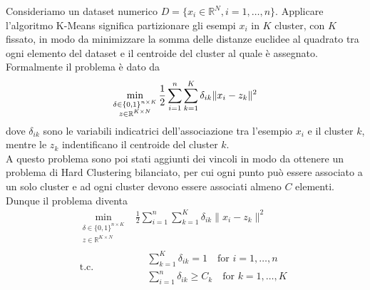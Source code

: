 \documentclass{article}
\begin{document}
    Consideriamo un dataset numerico $D=\{x_i \in \mathbb{R}^{N}, i=1,\dots,n\}$. Applicare l'algoritmo K-Means significa partizionare gli esempi $x_i$ in $K$ cluster, con $K$ fissato, in modo da minimizzare la somma delle distanze euclidee al quadrato tra ogni elemento del dataset e il centroide del cluster al quale è assegnato.
    Formalmente il problema è dato da
    \begin{equation}
        \min_{\begin{subarray}{c}
                  \delta \in \{0, 1\}^{n \times K}\\
                  z \in \mathbb{R}^{K \times N}
        \end{subarray}}
        \frac{1}{2} \sum_{i=1}^{n} \sum_{k=1}^{K} \delta_{ik} \|x_i-z_k\|^2
        \label{eq:kmeans}
    \end{equation}
    dove $\delta_{ik}$ sono le variabili indicatrici dell'associazione tra l'esempio $x_i$ e il cluster $k$, mentre le $z_k$ indentificano il centroide del cluster $k$.\\
    A questo problema sono poi stati aggiunti dei vincoli in modo da ottenere un problema di Hard Clustering bilanciato, per cui ogni punto può essere associato a un solo cluster e ad ogni cluster devono essere associati almeno $C$ elementi. Dunque il problema diventa
    \begin{equation}
        \begin{aligned}
            \min_{\substack{
                \delta \in \{0, 1\}^{n \times K}\\
                z \in \mathbb{R}^{K \times N}}} &
            \frac{1}{2} \sum_{i=1}^{n} \sum_{k=1}^{K} \delta_{ik} \|x_i-z_k\|^2 \\
            \text{t.c.} \quad &
            \begin{aligned}
                & \sum_{k=1}^{K} \delta_{ik} = 1 \quad \text{for $i=1,\dots,n$}\\
                & \sum_{i=1}^{n} \delta_{ik} \geq C_k \quad \text{for $k=1,\dots,K$}
            \end{aligned}
        \end{aligned}
        \label{eq:constrained_kmeans}
    \end{equation}
\end{document}
